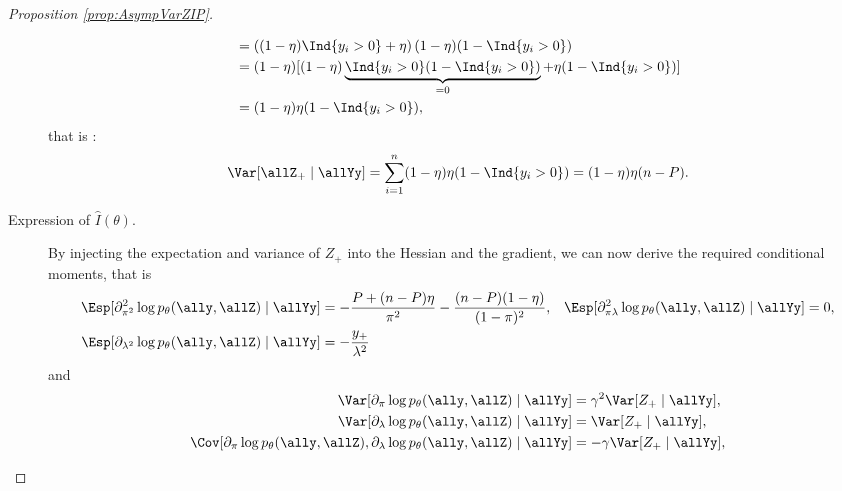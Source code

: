 \begin{proof}[Proposition \ref{prop:AsympVarZIP}]
\begin{description}
\begin{align*}
  &=  \left((1-\eta)\Ind{y_i>0} +\eta\right)(1-\eta)(1-\Ind{y_i>0})\\
  &= (1-\eta)[(1-\eta)\underbrace{\Ind{y_i>0}(1-\Ind{y_i>0})}_{=0}+\eta(1-\Ind{y_i>0})]\\
  &= (1-\eta)\eta (1-\Ind{y_i>0}),
  \end{align*}
  that is :
  $$
  \Var[ \allZ_+ \mid \allYy] = \sum_{i=1}^n (1-\eta)\eta (1-\Ind{y_i>0}) = (1-\eta)\eta (n-P).
  $$ 
  \item[Expression of $\widehat{I}(\theta)$.]
  By injecting the expectation and variance of $Z_+$ into the Hessian  and the gradient, we can now derive the required conditional moments, that is
  \begin{align*}
      \Esp[\partial^2_{\pi^2} \log p_\theta(\ally, \allZ)\mid \allYy] 
      & = -\frac{P + (n-P) \eta}{\pi^2} - \frac{(n-P)(1 - \eta)}{(1 - \pi)^2}, &
      \Esp[\partial^2_{\pi\lambda} \log p_\theta(\ally, \allZ)\mid \allYy] 
      & = 0, \\
      \Esp[\partial_{\lambda^2} \log p_\theta(\ally, \allZ)\mid \allYy]
      & = - \frac{y_+}{\lambda^2}
  \end{align*}
  and
  \begin{align*}
      \Var[\partial_{\pi} \log p_\theta(\ally, \allZ)\mid \allYy]
      & = \gamma^2 \Var[Z_+\mid \allYy], \\
      \Var[\partial_{\lambda} \log p_\theta(\ally, \allZ)\mid \allYy]
      & = \Var[Z_+\mid \allYy], \\
      \Cov[\partial_{\pi} \log p_\theta(\ally, \allZ), \partial_{\lambda} \log p_\theta(\ally, \allZ)\mid \allYy]
      & = - \gamma \Var[Z_+\mid \allYy],%
  \end{align*}
\end{description}




\end{proof}


